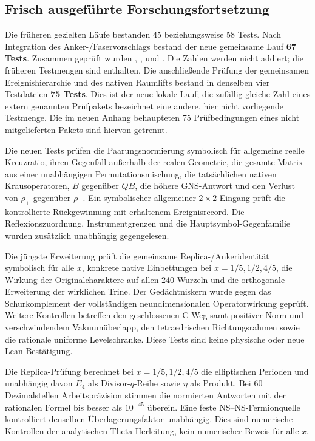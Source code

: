 \subsection{Frisch ausgeführte Forschungsfortsetzung}
Die früheren gezielten Läufe bestanden 45 beziehungsweise 58 Tests. Nach Integration des Anker-/Faservorschlags bestand der neue gemeinsame Lauf \textbf{67 Tests}. Zusammen geprüft wurden , ,  und . Die Zahlen werden nicht addiert; die früheren Testmengen sind enthalten. Die anschließende Prüfung der gemeinsamen Ereignishierarchie und des nativen Raumlifts bestand in denselben vier Testdateien \textbf{75 Tests}. Dies ist der neue lokale Lauf; die zufällig gleiche Zahl eines extern genannten Prüfpakets bezeichnet eine andere, hier nicht vorliegende Testmenge. Die im neuen Anhang behaupteten 75 Prüfbedingungen eines nicht mitgelieferten Pakets sind hiervon getrennt.

Die neuen Tests prüfen die Paarungsnormierung symbolisch für allgemeine reelle Kreuzratio, ihren Gegenfall außerhalb der realen Geometrie, die gesamte Matrix aus einer unabhängigen Permutationsmischung, die tatsächlichen nativen Krausoperatoren, $B$ gegenüber $QB$, die höhere GNS-Antwort und den Verlust von $\rho_+$ gegenüber $\rho_-$. Ein symbolischer allgemeiner $2\times2$-Eingang prüft die kontrollierte Rückgewinnung mit erhaltenem Ereignisrecord. Die Reflexionszuordnung, Instrumentgrenzen und die Hauptsymbol-Gegenfamilie wurden zusätzlich unabhängig gegengelesen.

Die jüngste Erweiterung prüft die gemeinsame Replica-/Ankeridentität symbolisch für alle $x$, konkrete native Einbettungen bei $x=1/5,1/2,4/5$, die Wirkung der Originalcharaktere auf allen 240 Wurzeln und die orthogonale Erweiterung der wirklichen Trine. Der Gedächtniskern wurde gegen das Schurkomplement der vollständigen neundimensionalen Operatorwirkung geprüft. Weitere Kontrollen betreffen den geschlossenen C-Weg samt positiver Norm und verschwindendem Vakuumüberlapp, den tetraedrischen Richtungsrahmen sowie die rationale uniforme Levelschranke. Diese Tests sind keine physische oder neue Lean-Bestätigung.

Die Replica-Prüfung berechnet bei $x=1/5,1/2,4/5$ die elliptischen Perioden und unabhängig davon $E_4$ als Divisor-$q$-Reihe sowie $\eta$ als Produkt. Bei 60 Dezimalstellen Arbeitspräzision stimmen die normierten Antworten mit der rationalen Formel bis besser als $10^{-45}$ überein. Eine feste NS--NS-Fermionquelle kontrolliert denselben Überlagerungsfaktor unabhängig. Dies sind numerische Kontrollen der analytischen Theta-Herleitung, kein numerischer Beweis für alle $x$.

